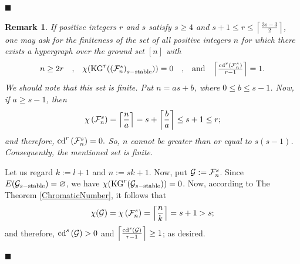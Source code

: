 \documentclass[11pt]{article}
\newtheorem{prerem}{{\bf Remark}}
\newenvironment{rem}{\begin{prerem}{\hspace{-0.5
               em}{\bf.\ }}}{\end{prerem}}
\begin{document}
        \hfill{$\blacksquare$}
        
        
\begin{rem}
	If positive integers $r$ and $s$ satisfy $s\geq 4$ and $s+1 \leq r \leq \left\lceil  \frac{3s-3}{2}  \right\rceil$, one may ask for the finiteness of the set of all positive integers $n$ for which
	there exists a hypergraph over the ground set $[n]$ with
	$$\begin{array}{cccccc}
		n\geq 2r    &   ,    &  \chi ({\rm KG}^r (\left({\cal F}_{n}^{s}\right)_{s-{\rm stable}}))=0     &   ,      &
		{\rm and}    &    \left\lceil  \frac{{\rm cd}^r \left({\cal F}_{n}^{s}\right)}{r-1}   \right\rceil  = 1.   \\
	\end{array}$$
	We should note that this set is finite. Put $n=as+b$, where $0 \leq b \leq s-1$. Now, if
	$a \geq s-1$, then 
	$$\chi \left({\cal F}_{n}^{s}\right) = \left\lceil  \frac{n}{a}  \right\rceil 
	= s + \left\lceil  \frac{b}{a}  \right\rceil \leq s+1 \leq r;$$
	and therefore, ${\rm cd}^r \left({\cal F}_{n}^{s}\right) =0.$
	So, $n$ cannot be greater than or equal to $s(s-1)$. Consequently, the mentioned set is finite.    
\end{rem}


	Let us regard $k:= l +1$ and $n:=sk+1$.
	Now, put ${\cal G} := {\cal F}_{n}^{s}$.		
	Since $E({\cal G}_{s-{\rm stable}}) = \varnothing$, we have
	$\chi ({\rm KG}^r ({\cal G}_{s-{\rm stable}}))=0$.
	Now, according to The Theorem \ref{ChromaticNumber}, it follows that
	$$\chi ({\cal G}) = \chi \left({\cal F}_{n}^{s}\right) = \left\lceil  \frac{n}{k}  \right\rceil 
	= s+1 > s;$$
	and therefore, ${\rm cd}^s \left(   {\cal G}  \right) > 0$ and
	$\left\lceil  \frac{{\rm cd}^s ({\cal G})}{r-1}   \right\rceil  \geq 1$; as desired.

    \hfill{$\blacksquare$}
    
\end{document}
